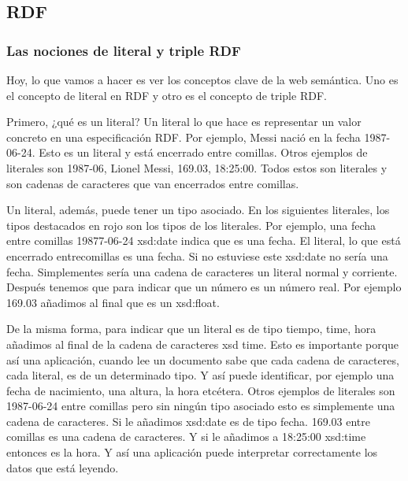 
\subsection{RDF}


\subsubsection{Las nociones de literal y triple RDF}

Hoy, lo que vamos a hacer es ver los conceptos clave de la web semántica. Uno es el concepto de literal en RDF y otro es el concepto de triple RDF.

Primero, ¿qué es un literal? Un literal lo que hace es representar un valor concreto en una especificación RDF. Por ejemplo, Messi nació en la fecha 1987-06-24. Esto es un literal y está encerrado entre comillas. Otros ejemplos de literales son 1987-06, Lionel Messi, 169.03, 18:25:00. Todos estos son literales y son cadenas de caracteres que van encerrados entre comillas.

Un literal, además, puede tener un tipo asociado. En los siguientes literales, los tipos destacados en rojo son los tipos de los literales. Por ejemplo, una fecha entre comillas 19877-06-24 xsd:date indica que es una fecha. El literal, lo que está encerrado entrecomillas es una fecha. Si no estuviese este xsd:date no sería una fecha. Simplementes sería una cadena de caracteres un literal normal y corriente. Después tenemos que para indicar que un número es un número real. Por ejemplo 169.03 añadimos al final que es un xsd:float.

De la misma forma, para indicar que un literal es de tipo tiempo, time, hora añadimos al final de la cadena de caracteres xsd time. Esto es importante porque así una aplicación, cuando lee un documento sabe que cada cadena de caracteres, cada literal, es de un determinado tipo. Y así puede identificar, por ejemplo una fecha de nacimiento, una altura, la hora etcétera. Otros ejemplos de literales son 1987-06-24 entre comillas pero sin ningún tipo asociado esto es simplemente una cadena de caracteres. Si le añadimos xsd:date es de tipo fecha. 169.03 entre comillas es una cadena de caracteres. Y si le añadimos a 18:25:00 xsd:time entonces es la hora. Y así una aplicación puede interpretar correctamente los datos que está leyendo.


